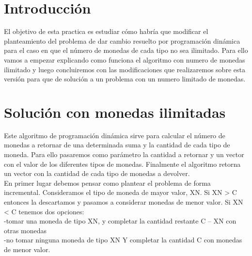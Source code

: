 	\listoftables %
	
	\newpage
	
	\section[Introducción]{Introducción}
	
	El objetivo de esta practica es estudiar cómo habría que modificar el planteamiento del problema de dar cambio resuelto por programación dinámica para el caso en que el número de monedas de cada tipo no sea ilimitado. Para ello vamos a empezar explicando como funciona el algoritmo con numero de monedas ilimitado y luego concluiremos con las modificaciones que realizaremos sobre esta versión para que de solución a un problema con un numero limitado de monedas. 
	

	\section[Solución con monedas ilimitadas]{Solución con monedas ilimitadas}
	
	Este algoritmo de programación dinámica sirve para calcular el número  de monedas a retornar de una determinada suma y la cantidad de cada tipo de moneda. Para ello pasaremos como parámetro la cantidad a retornar y un vector con el valor de  los diferentes tipos de monedas. Finalmente el algoritmo retorna un vector con la cantidad de cada tipo de monedas a devolver. \\
	
	En primer lugar debemos pensar como plantear el problema de forma incremental. Consideramos el tipo de moneda de mayor valor, XN. Si XN > C entonces la descartamos y pasamos a considerar monedas de menor valor. Si XN < C tenemos dos opciones: \\
	
	-tomar una moneda de tipo XN, y completar la cantidad restante C – XN con otras monedas\\
	-no tomar ninguna moneda de tipo XN Y completar la cantidad C con monedas de menor valor.\\
	
